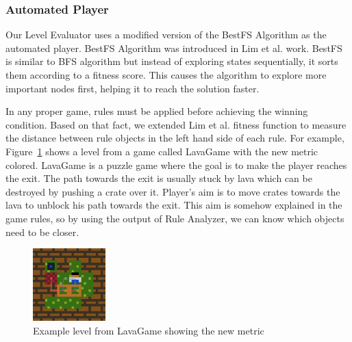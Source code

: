 \documentclass[letterpaper]{article}
\newcommand{\figref}[1]{Figure~\ref{Figure:#1}}
\begin{document}
\subsubsection{Automated Player}
Our Level Evaluator uses a modified version of the BestFS Algorithm as the automated player. BestFS Algorithm was introduced in Lim et al.\cite{puzzleScriptGeneration} work. BestFS is similar to BFS algorithm but instead of exploring states sequentially, it sorts them according to a fitness score. This causes the algorithm to explore more important nodes first, helping it to reach the solution faster.\\\par

In any proper game, rules must be applied before achieving the winning condition. Based on that fact, we extended Lim et al. fitness function to measure the distance between rule objects in the left hand side of each rule. For example, \figref{lavaGame} shows a level from a game called LavaGame with the new metric colored. LavaGame is a puzzle game where the goal is to make the player reaches the exit. The path towards the exit is usually stuck by lava which can be destroyed by pushing a crate over it. Player's aim is to move crates towards the lava to unblock his path towards the exit. This aim is somehow explained in the game rules, so by using the output of Rule Analyzer, we can know which objects need to be closer.

\begin{figure}
  	\centering
    \includegraphics[width=0.25\textwidth]{Images/lavaGame}
    \caption{Example level from LavaGame showing the new metric}
    \label{Figure:lavaGame}
\end{figure}
\end{document}

